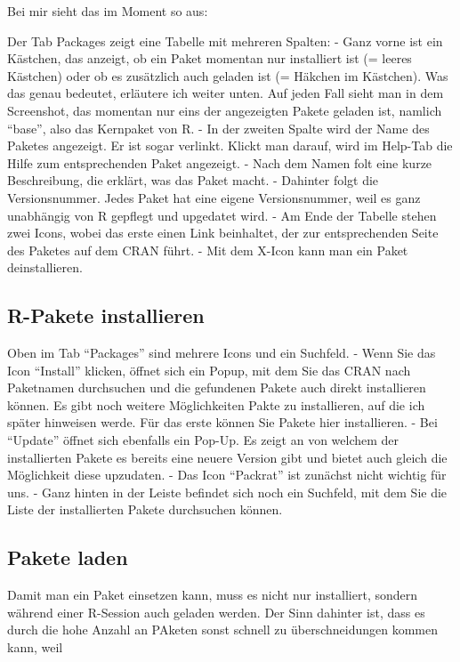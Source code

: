 \documentclass[
]{book}
\begin{document}
Bei mir sieht das im Moment so aus:

Der Tab Packages zeigt eine Tabelle mit mehreren Spalten:
- Ganz vorne ist ein Kästchen, das anzeigt, ob ein Paket momentan nur installiert ist (= leeres Kästchen) oder ob es zusätzlich auch geladen ist (= Häkchen im Kästchen). Was das genau bedeutet, erläutere ich weiter unten. Auf jeden Fall sieht man in dem Screenshot, das momentan nur eins der angezeigten Pakete geladen ist, namlich ``base'', also das Kernpaket von R.
- In der zweiten Spalte wird der Name des Paketes angezeigt. Er ist sogar verlinkt. Klickt man darauf, wird im Help-Tab die Hilfe zum entsprechenden Paket angezeigt.
- Nach dem Namen folt eine kurze Beschreibung, die erklärt, was das Paket macht.
- Dahinter folgt die Versionsnummer. Jedes Paket hat eine eigene Versionsnummer, weil es ganz unabhängig von R gepflegt und upgedatet wird.
- Am Ende der Tabelle stehen zwei Icons, wobei das erste einen Link beinhaltet, der zur entsprechenden Seite des Paketes auf dem CRAN führt.
- Mit dem X-Icon kann man ein Paket deinstallieren.

\hypertarget{r-pakete-installieren}{%
\subsection{R-Pakete installieren}\label{r-pakete-installieren}}

Oben im Tab ``Packages'' sind mehrere Icons und ein Suchfeld.
- Wenn Sie das Icon ``Install'' klicken, öffnet sich ein Popup, mit dem Sie das CRAN nach Paketnamen durchsuchen und die gefundenen Pakete auch direkt installieren können. Es gibt noch weitere Möglichkeiten Pakte zu installieren, auf die ich später hinweisen werde. Für das erste können Sie Pakete hier installieren.
- Bei ``Update'' öffnet sich ebenfalls ein Pop-Up. Es zeigt an von welchem der installierten Pakete es bereits eine neuere Version gibt und bietet auch gleich die Möglichkeit diese upzudaten.
- Das Icon ``Packrat'' ist zunächst nicht wichtig für uns.
- Ganz hinten in der Leiste befindet sich noch ein Suchfeld, mit dem Sie die Liste der installierten Pakete durchsuchen können.

\hypertarget{pakete-laden}{%
\subsection{Pakete laden}\label{pakete-laden}}

Damit man ein Paket einsetzen kann, muss es nicht nur installiert, sondern während einer R-Session auch geladen werden. Der Sinn dahinter ist, dass es durch die hohe Anzahl an PAketen sonst schnell zu überschneidungen kommen kann, weil
\end{document}
